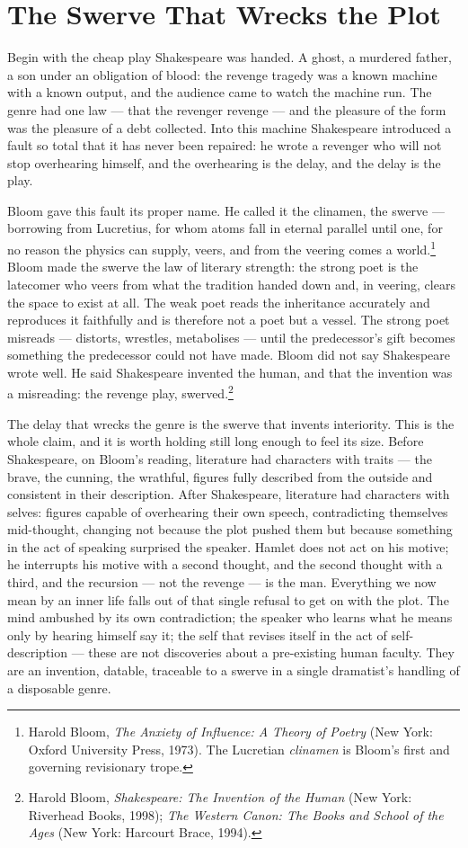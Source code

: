 \documentclass[11pt]{article}
\begin{document}
\section{The Swerve That Wrecks the Plot}

Begin with the cheap play Shakespeare was handed. A ghost, a murdered father, a son under an obligation of blood: the revenge tragedy was a known machine with a known output, and the audience came to watch the machine run. The genre had one law --- that the revenger revenge --- and the pleasure of the form was the pleasure of a debt collected. Into this machine Shakespeare introduced a fault so total that it has never been repaired: he wrote a revenger who will not stop overhearing himself, and the overhearing is the delay, and the delay is the play.

Bloom gave this fault its proper name. He called it the clinamen, the swerve --- borrowing from Lucretius, for whom atoms fall in eternal parallel until one, for no reason the physics can supply, veers, and from the veering comes a world.\footnote{Harold Bloom, \emph{The Anxiety of Influence: A Theory of Poetry} (New York: Oxford University Press, 1973). The Lucretian \emph{clinamen} is Bloom's first and governing revisionary trope.} Bloom made the swerve the law of literary strength: the strong poet is the latecomer who veers from what the tradition handed down and, in veering, clears the space to exist at all. The weak poet reads the inheritance accurately and reproduces it faithfully and is therefore not a poet but a vessel. The strong poet misreads --- distorts, wrestles, metabolises --- until the predecessor's gift becomes something the predecessor could not have made. Bloom did not say Shakespeare wrote well. He said Shakespeare invented the human, and that the invention was a misreading: the revenge play, swerved.\footnote{Harold Bloom, \emph{Shakespeare: The Invention of the Human} (New York: Riverhead Books, 1998); \emph{The Western Canon: The Books and School of the Ages} (New York: Harcourt Brace, 1994).}

The delay that wrecks the genre is the swerve that invents interiority. This is the whole claim, and it is worth holding still long enough to feel its size. Before Shakespeare, on Bloom's reading, literature had characters with traits --- the brave, the cunning, the wrathful, figures fully described from the outside and consistent in their description. After Shakespeare, literature had characters with selves: figures capable of overhearing their own speech, contradicting themselves mid-thought, changing not because the plot pushed them but because something in the act of speaking surprised the speaker. Hamlet does not act on his motive; he interrupts his motive with a second thought, and the second thought with a third, and the recursion --- not the revenge --- is the man. Everything we now mean by an inner life falls out of that single refusal to get on with the plot. The mind ambushed by its own contradiction; the speaker who learns what he means only by hearing himself say it; the self that revises itself in the act of self-description --- these are not discoveries about a pre-existing human faculty. They are an invention, datable, traceable to a swerve in a single dramatist's handling of a disposable genre.
\end{document}
